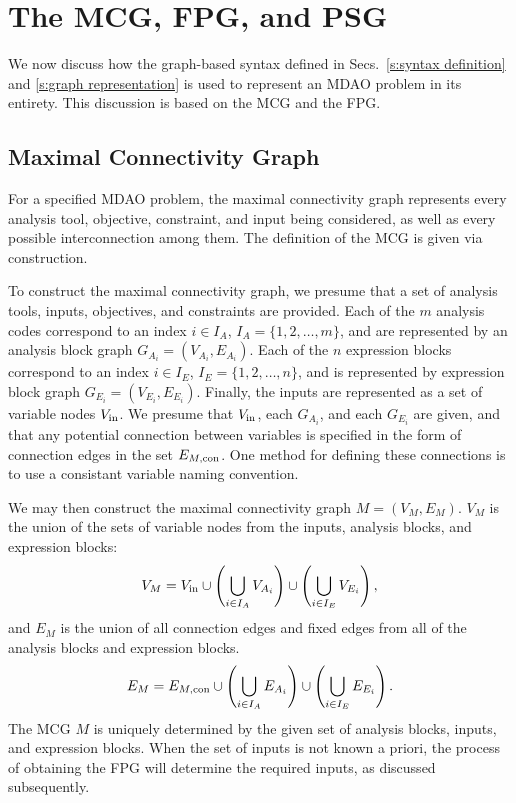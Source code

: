 \section{The MCG, FPG, and PSG}
    \label{s:building graphs}
We now discuss how the graph-based syntax defined in Secs.~\ref{s:syntax definition} and \ref{s:graph representation}  is used to represent an MDAO problem in its entirety. This discussion is based on the MCG and the FPG.

\subsection{Maximal Connectivity Graph}
    \label{ss:MCG}
For a specified MDAO problem, the maximal connectivity graph represents every analysis tool, objective, constraint, and input being considered, as well as every possible interconnection among them.
The definition of the MCG is given via construction.
    
    To construct the maximal connectivity graph, we presume that a set of analysis tools, inputs, objectives, and constraints are provided. 
    Each of the $m$ analysis codes correspond to an index $i\in I_A$, $I_A=\{1,2,\ldots,m\}$, and are represented by an analysis block graph $G_{A_i}=(V_{A_i},E_{A_i})$.
    Each of the $n$ expression blocks correspond to an index $i\in I_E$, $I_E=\{1,2,\ldots,n\}$, and is represented by expression block graph $G_{E_i}=(V_{E_i},E_{E_i})$.
    Finally, the inputs are represented as a set of variable nodes $V_\textrm{in}$.
    We presume that $V_\textrm{in}$, each $G_{A_i}$, and each $G_{E_i}$ are given, and that any potential connection between variables is specified in the form of connection edges in the set $E_{M,\textrm{con}}$. One method for defining these connections is to use a consistant variable naming convention.

    We may then construct the maximal connectivity graph $M=(V_M,E_M)$. $V_M$ is 
    the union of the sets of variable nodes from the inputs, analysis blocks, and expression blocks: 
    \begin{equation}
    V_M = V_\textrm{in} \cup \left( \bigcup_{i \in I_A} V_{A_i} \right) \cup \left( \bigcup_{i \in I_E} V_{E_i} \right),
    \end{equation}
    and
    $E_M$ is the union of all connection edges and fixed edges from all of the analysis blocks and expression blocks. 
    \begin{equation}
    E_M = E_{M,\textrm{con}} \cup \left( \bigcup_{i \in I_A} E_{A_i} \right)  \cup \left( \bigcup_{i \in I_E} E_{E_i} \right).
    \end{equation}
    The MCG $M$ is uniquely determined by the given set of analysis blocks, inputs, and expression blocks. 
    When the set of inputs is not known a priori, the process of obtaining the FPG will determine the required inputs, as discussed subsequently.

